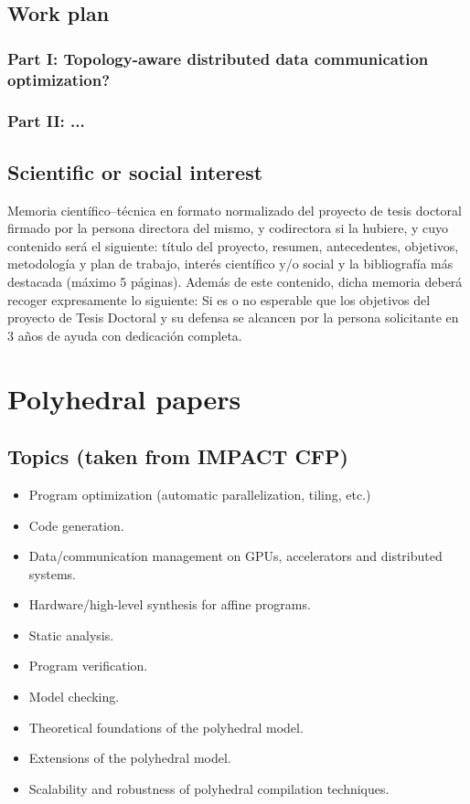 \documentclass[a4paper, 11pt]{article}
\begin{document}
\subsection{Work plan}
\subsubsection{Part I: Topology-aware distributed data communication optimization?}
\subsubsection{Part II: ...}

\subsection{Scientific or social interest}

 Memoria científico–técnica en formato normalizado del proyecto de tesis doctoral firmado por la persona directora del mismo, y codirectora si la hubiere, y cuyo contenido será el siguiente: título del proyecto, resumen, antecedentes, objetivos, metodología y plan de trabajo, interés científico y/o social y la bibliografía más destacada (máximo 5 páginas). Además de este contenido, dicha memoria deberá recoger expresamente lo siguiente: Si es o no esperable que los objetivos del proyecto de Tesis Doctoral y su defensa se alcancen por la persona solicitante en 3 años de ayuda con dedicación completa.


\section{Polyhedral papers}\label{sec:polly_papers}
\subsection{Topics (taken from IMPACT CFP)}
\begin{itemize}
    \item Program optimization (automatic parallelization, tiling, etc.)
    \item Code generation.
    \item Data/communication management on GPUs, accelerators and distributed systems.
    \item Hardware/high-level synthesis for affine programs.
    \item Static analysis.
    \item Program verification.
    \item Model checking.
    \item Theoretical foundations of the polyhedral model.
    \item Extensions of the polyhedral model.
    \item Scalability and robustness of polyhedral compilation techniques.
\end{itemize}
\end{document}

